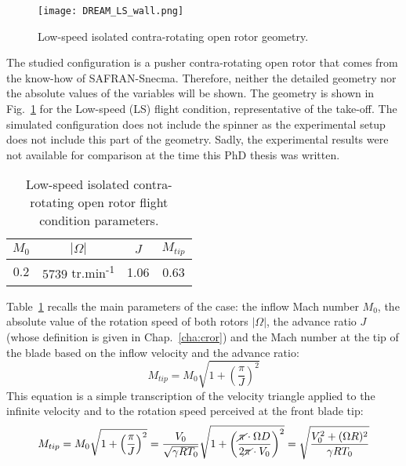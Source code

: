 

\begin{figure}[htp]
  \centering
  \texttt{[image: DREAM\_LS\_wall.png]}
  \caption{Low-speed isolated contra-rotating open rotor geometry.}
  \label{fig:dream_ls_wall}
\end{figure}

The studied configuration is a pusher contra-rotating open rotor
that comes from the know-how of SAFRAN-Snecma. Therefore,
neither the detailed geometry nor the absolute values of the variables
will be shown.
The geometry is shown in Fig.~\ref{fig:dream_ls_wall} for the
Low-speed (LS) flight condition, representative of the take-off. 
The simulated configuration does not include the spinner as the
experimental setup does not include this part of the geometry.
Sadly, the experimental results were not available for comparison
at the time this PhD thesis was written.

\begin{table}[htp]
   \centering
  \begin{tabular}{cccc}
    \toprule
    $M_0$ & $|\Omega|$ & $J$ & $M_{tip}$ \\
    \midrule
    $0.2$ & $5739$ tr.min\textsuperscript{-1} & 1.06 & 0.63 \\
    \bottomrule
  \end{tabular}
  \caption{Low-speed isolated contra-rotating open rotor flight condition parameters.}
  \label{tab:dream_ls_flight_condition}
\end{table} 
Table~\ref{tab:dream_ls_flight_condition} recalls the main
parameters of the case: the inflow Mach number $M_0$,
the absolute value of the rotation speed of both rotors $|\Omega|$,
the advance ratio $J$ (whose definition is given in Chap.~\ref{cha:cror})
and the Mach number at the tip of
the blade based on the inflow velocity and the advance ratio:
\begin{equation}
	M_{tip} = M_0 \sqrt{1 + \left(\frac{\pi}{J} \right)^2}
\end{equation}
This equation is a simple transcription of the velocity triangle
applied to the infinite velocity and to the rotation speed perceived
at the front blade tip:
\begin{equation}
    M_{tip} = M_0 \sqrt{1 + \left(\frac{\pi}{J}\right)^2} = 
    \frac{V_0}{\sqrt{\gamma R T_0}} \sqrt{1 + \left(\frac{
    	\cancel{\pi} \cdot \Omega D}{
    	2 \cancel{\pi} \cdot V_0}\right)^2} =
    \sqrt{\frac{V_0^2 + (\Omega R)^2}{\gamma R T_0}}
    \label{eq:m_tip_explained}
\end{equation}

